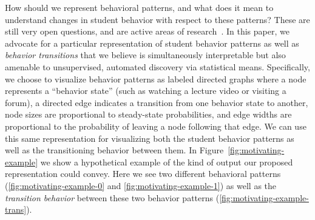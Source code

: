 How should we represent behavioral patterns, and what does it mean to
understand changes in student behavior with respect to these patterns?
These are still very open questions, and are active areas of
research~\cite{Kizilcec:2013:LAK, Faucon:2016:EDM, Davis:2016:EDM,
Shih:2010:EDM}. In this paper, we advocate for a particular representation
of student behavior patterns as well as \emph{behavior transitions} that we
believe is simultaneously interpretable but also amenable to unsupervised,
automated discovery via statistical means. Specifically, we choose to
visualize behavior patterns as labeled directed graphs where a node
represents a ``behavior state'' (such as watching a lecture video or
visiting a forum), a directed edge indicates a transition from one
behavior state to another, node sizes are proportional to steady-state
probabilities, and edge widths are proportional to the probability of
leaving a node following that edge. We can use this same representation for
visualizing both the student behavior patterns as well as the transitioning
behavior between them. In Figure~\ref{fig:motivating-example} we show a
hypothetical example of the kind of output our proposed representation
could convey.  Here we see two different behavioral patterns
(\ref{fig:motivating-example-0} and \ref{fig:motivating-example-1}) as well
as the \emph{transition behavior} between these two behavior patterns
(\ref{fig:motivating-example-trans}).
